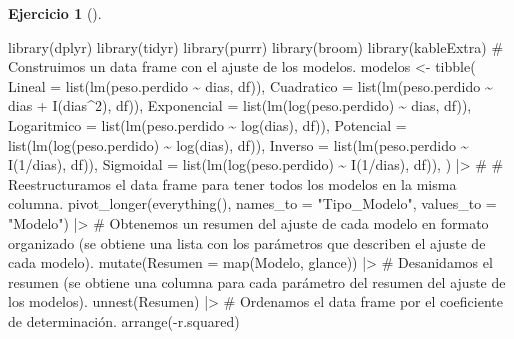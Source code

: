 \documentclass[
  a4paper,
]{scrreport}
\newenvironment{Shaded}{\begin{snugshade}}{\end{snugshade}}
\newcommand{\AttributeTok}[1]{\textcolor[rgb]{0.40,0.45,0.13}{#1}}
\newcommand{\CommentTok}[1]{\textcolor[rgb]{0.37,0.37,0.37}{#1}}
\newcommand{\DecValTok}[1]{\textcolor[rgb]{0.68,0.00,0.00}{#1}}
\newcommand{\FunctionTok}[1]{\textcolor[rgb]{0.28,0.35,0.67}{#1}}
\newcommand{\NormalTok}[1]{\textcolor[rgb]{0.00,0.23,0.31}{#1}}
\newcommand{\OtherTok}[1]{\textcolor[rgb]{0.00,0.23,0.31}{#1}}
\newcommand{\SpecialCharTok}[1]{\textcolor[rgb]{0.37,0.37,0.37}{#1}}
\newcommand{\StringTok}[1]{\textcolor[rgb]{0.13,0.47,0.30}{#1}}
\theoremstyle{definition}
\newtheorem{exercise}{Ejercicio}[chapter]
\theoremstyle{remark}
\begin{document}
\begin{exercise}[]
\begin{enumerate}
\begin{tcolorbox}
\begin{Shaded}
\begin{Highlighting}[]
\FunctionTok{library}\NormalTok{(dplyr)}
\FunctionTok{library}\NormalTok{(tidyr)}
\FunctionTok{library}\NormalTok{(purrr)}
\FunctionTok{library}\NormalTok{(broom)}
\FunctionTok{library}\NormalTok{(kableExtra)}
\CommentTok{\# Construimos un data frame con el ajuste de los modelos.}
\NormalTok{modelos }\OtherTok{\textless{}{-}} \FunctionTok{tibble}\NormalTok{(}
        \AttributeTok{Lineal =} \FunctionTok{list}\NormalTok{(}\FunctionTok{lm}\NormalTok{(peso.perdido }\SpecialCharTok{\textasciitilde{}}\NormalTok{ dias, df)),}
        \AttributeTok{Cuadratico =} \FunctionTok{list}\NormalTok{(}\FunctionTok{lm}\NormalTok{(peso.perdido }\SpecialCharTok{\textasciitilde{}}\NormalTok{ dias }\SpecialCharTok{+} \FunctionTok{I}\NormalTok{(dias}\SpecialCharTok{\^{}}\DecValTok{2}\NormalTok{), df)),}
        \AttributeTok{Exponencial =} \FunctionTok{list}\NormalTok{(}\FunctionTok{lm}\NormalTok{(}\FunctionTok{log}\NormalTok{(peso.perdido) }\SpecialCharTok{\textasciitilde{}}\NormalTok{ dias, df)),}
        \AttributeTok{Logaritmico =} \FunctionTok{list}\NormalTok{(}\FunctionTok{lm}\NormalTok{(peso.perdido }\SpecialCharTok{\textasciitilde{}} \FunctionTok{log}\NormalTok{(dias), df)),}
        \AttributeTok{Potencial =} \FunctionTok{list}\NormalTok{(}\FunctionTok{lm}\NormalTok{(}\FunctionTok{log}\NormalTok{(peso.perdido) }\SpecialCharTok{\textasciitilde{}} \FunctionTok{log}\NormalTok{(dias), df)),}
        \AttributeTok{Inverso =} \FunctionTok{list}\NormalTok{(}\FunctionTok{lm}\NormalTok{(peso.perdido }\SpecialCharTok{\textasciitilde{}} \FunctionTok{I}\NormalTok{(}\DecValTok{1}\SpecialCharTok{/}\NormalTok{dias), df)),}
        \AttributeTok{Sigmoidal =} \FunctionTok{list}\NormalTok{(}\FunctionTok{lm}\NormalTok{(}\FunctionTok{log}\NormalTok{(peso.perdido) }\SpecialCharTok{\textasciitilde{}} \FunctionTok{I}\NormalTok{(}\DecValTok{1}\SpecialCharTok{/}\NormalTok{dias), df)),}
\NormalTok{    )  }\SpecialCharTok{|\textgreater{}} 
    \CommentTok{\# }
    \CommentTok{\# Reestructuramos el data frame para tener todos los modelos en la misma columna.}
    \FunctionTok{pivot\_longer}\NormalTok{(}\FunctionTok{everything}\NormalTok{(), }\AttributeTok{names\_to =} \StringTok{"Tipo\_Modelo"}\NormalTok{, }\AttributeTok{values\_to =} \StringTok{"Modelo"}\NormalTok{)  }\SpecialCharTok{|\textgreater{}} 
    \CommentTok{\# Obtenemos un resumen del ajuste de cada modelo en formato organizado (se obtiene una lista con los parámetros que describen el ajuste de cada modelo).}
    \FunctionTok{mutate}\NormalTok{(}\AttributeTok{Resumen =} \FunctionTok{map}\NormalTok{(Modelo, glance)) }\SpecialCharTok{|\textgreater{}} 
    \CommentTok{\# Desanidamos el resumen (se obtiene una columna para cada parámetro del resumen del ajuste de los modelos).}
    \FunctionTok{unnest}\NormalTok{(Resumen)  }\SpecialCharTok{|\textgreater{}} 
    \CommentTok{\# Ordenamos el data frame por el coeficiente de determinación.}
    \FunctionTok{arrange}\NormalTok{(}\SpecialCharTok{{-}}\NormalTok{r.squared)}


\end{Highlighting}
\end{Shaded}
\end{tcolorbox}
\end{enumerate}
\end{exercise}
\end{document}
